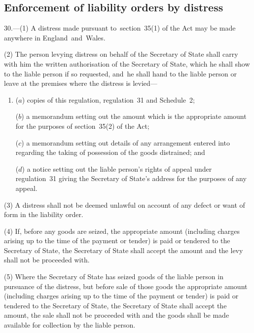 \documentclass[12pt,a4paper]{article}
\begin{document}

\subsection[30. Enforcement of liability orders by distress]{Enforcement of liability orders by distress}

30.—(1) A distress made pursuant to~section~35(1) of the Act may be made anywhere in England~and~Wales.

(2) The person levying distress on behalf of the Secretary of State shall carry with him the written authorisation of the Secretary of State, which he shall show to the liable person if so requested, and~he shall hand to the liable person or leave at the premises where the distress is levied—
\begin{enumerate}\item[]
($a$) copies of this regulation, regulation~31 and Schedule~2;

($b$) a memorandum setting out the amount which is the appropriate amount for the purposes of section~35(2) of the Act;

($c$) a memorandum setting out details of any arrangement entered into regarding the taking of possession of the goods distrained; and

($d$) a notice setting out the liable person’s rights of appeal under regulation~31 giving the Secretary of State’s address for the purposes of any appeal.
\end{enumerate}

(3) A distress shall not be deemed unlawful on account of any defect or want of form in the liability order.

(4) If, before any goods are seized, the appropriate amount (including charges arising up to the time of the payment or tender) is paid or tendered to the Secretary of State, the Secretary of State shall accept the amount and the levy shall not be proceeded with.

(5) Where the Secretary of State has seized goods of the liable person in pursuance of the distress, but before sale of those goods the appropriate amount (including charges arising up to the time of the payment or tender) is paid or tendered to the Secretary of State, the Secretary of State shall accept the amount, the sale shall not be proceeded with and the goods shall be made available for collection by the liable person.
\end{document}
